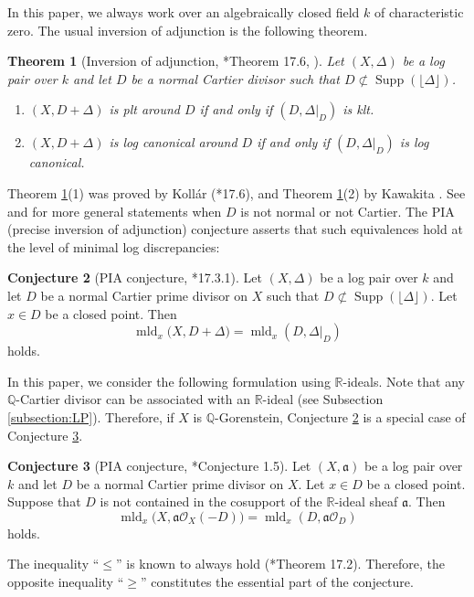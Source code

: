 \documentclass[a4paper,11pt]{amsart}
\newtheorem{thm}{Theorem}[section]
\theoremstyle{definition}
\newtheorem{conj}[thm]{Conjecture}
\theoremstyle{remark}
\begin{document}
In this paper, we always work over an algebraically closed field $k$ of characteristic zero. 
The usual inversion of adjunction is the following theorem.
\begin{thm}[Inversion of adjunction, {\cite{92}*{Theorem 17.6}, \cite{Kaw07}}]\label{thm:IA}
Let $(X, \Delta)$ be a log pair over $k$ and let $D$ be a normal Cartier divisor such that $D \not \subset \operatorname{Supp} (\lfloor \Delta \rfloor )$. 
\begin{enumerate}
\item $(X, D + \Delta)$ is plt around $D$ if and only if $(D, \Delta |_D)$ is klt. 
\item $(X, D + \Delta)$ is log canonical around $D$ if and only if $(D, \Delta |_D)$ is log canonical.
\end{enumerate}
\end{thm}
\noindent
Theorem \ref{thm:IA}(1) was proved by Koll{\'a}r (\cite{92}*{17.6}), and Theorem \ref{thm:IA}(2) by Kawakita \cite{Kaw07}. 
See \cite{92} and \cite{Kaw07} for more general statements when $D$ is not normal or not Cartier. 
The PIA (precise inversion of adjunction) conjecture asserts that such equivalences hold at the level of minimal log discrepancies: 
\begin{conj}[PIA conjecture, {\cite{92}*{17.3.1}}]\label{conj:PIA2}
Let $(X, \Delta)$ be a log pair over $k$ and let $D$ be a normal Cartier prime divisor on $X$ such that $D \not \subset \operatorname{Supp} (\lfloor \Delta \rfloor )$. 
Let $x \in D$ be a closed point. 
Then 
\[
\operatorname{mld}_x ( X, D + \Delta \bigr) = \operatorname{mld}_x (D, \Delta |_D)
\]
holds. 
\end{conj}
\noindent
In this paper, we consider the following formulation using $\mathbb{R}$-ideals.
Note that any $\mathbb{Q}$-Cartier divisor can be associated with an $\mathbb{R}$-ideal (see Subsection \ref{subsection:LP}).  Therefore, if $X$ is $\mathbb{Q}$-Gorenstein, Conjecture \ref{conj:PIA2} is a special case of Conjecture \ref{conj:PIA}. 
\begin{conj}[PIA conjecture, {\cite{EMY03}*{Conjecture 1.5}}]\label{conj:PIA}
Let $(X, \mathfrak{a})$ be a log pair over $k$ and let $D$ be a normal Cartier prime divisor on $X$. 
Let $x \in D$ be a closed point. 
Suppose that $D$ is not contained in the cosupport of the $\mathbb{R}$-ideal sheaf $\mathfrak{a}$. 
Then 
\[
\operatorname{mld}_x \bigl( X, \mathfrak{a} \mathcal{O}_X(-D) \bigr) = \operatorname{mld}_x (D, \mathfrak{a} \mathcal{O}_D)
\]
holds. 
\end{conj}
\noindent
The inequality ``$\le$'' is known to always hold (\cite{92}*{Theorem 17.2}).  
Therefore, the opposite inequality ``$\ge$'' constitutes the essential part of the conjecture.
\end{document}
